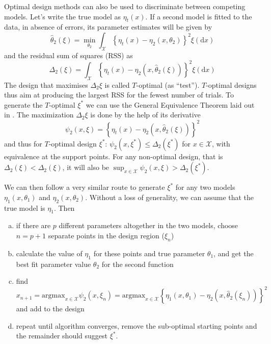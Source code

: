 \documentclass[12pt]{iopart}
\begin{document}
Optimal design methods can also be used to discriminate between competing models. Let's write the true model as $\eta_t(x)$. If a second model is fitted to the data, in absence of errors, its parameter estimates will be given by
\begin{equation}
\hat \theta_2(\xi) = \min_{\theta_2} \int_{\mathcal{X}} \left\{\eta_t(x) - \eta_2(x, \theta_2)\right\}^2 \xi(\mathrm{d}x)
\end{equation}
and the residual sum of squares (RSS) as
\begin{equation}
\Delta_2(\xi) = \int_{\mathcal{X}} \left\{\eta_t(x) - \eta_2(x, \hat \theta_2(\xi))\right\}^2 \xi(\mathrm{d}x)
\label{eq:rss}
\end{equation}
The design that maximises $\Delta_2{\xi}$ is called $T$-optimal (as ``test''). $T$-optimal designs thus aim at producing the largest RSS for the fewest number of trials. To generate the $T$-optimal $\xi^*$ we can use the General Equivalence Theorem laid out in . The maximization $\Delta_2{\xi}$ is done by the help of its derivative
\begin{equation}
\psi_2(x, \xi) = \left\{\eta_t(x) - \eta_2(x, \hat \theta_2(\xi))\right\}^2
\end{equation}
and thus for $T$-optimal design $\xi^*$: $\psi_2(x, \xi^*) \leq \Delta_2(\xi^*)$ for $x \in \mathcal{X}$, with equivalence at the support points. For any non-optimal design, that is $\Delta_2(\xi) < \Delta_2(\xi)$, it will also be $\sup_{x \in \mathcal{X}} \psi_2(x, \xi) > \Delta_2(\xi^*)$.

We can then follow a very similar route to generate $\xi^*$ for any two models $\eta_1(x, \theta_1)$ and $\eta_2(x, \theta_2)$. Without a loss of generality, we can assume that the true model is $\eta_1$. Then
\begin{enumerate}[(a)]
\item if there are $p$ different parameters altogether in the two models, choose $n = p+1$ separate points in the design region ($\xi_n$)
\item calculate the value of $\eta_1$ for these points and true parameter $\theta_1$, and get the best fit parameter value $\theta_2$ for the second function
\item find $x_{n+1} = \mathrm{argmax}_{x \in \mathcal{X}}\psi_2(x, \xi_n) = \mathrm{argmax}_{x \in \mathcal{X}} \left\{\eta_1(x, \theta_1) - \eta_2(x, \hat \theta_2(\xi_n))\right\}^2$ and add to the design
\item repeat until algorithm converges, remove the sub-optimal starting points and the remainder should suggest $\xi^*$.
\end{enumerate}
\end{document}
